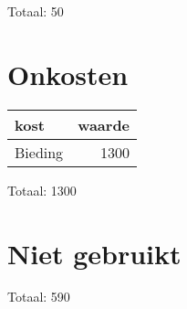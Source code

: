 \documentclass[12pt]{article}
\begin{document}
	Totaal: 50
	\section*{Onkosten}
	
	\begin{tabular}{l|r}
		kost& waarde \\
		\hline
		Bieding &1300 \\
		
		
	\end{tabular}
\newline
	Totaal: 1300
	
	\section*{Niet gebruikt}
	Totaal: 590
	

	
	
	
\end{document}
